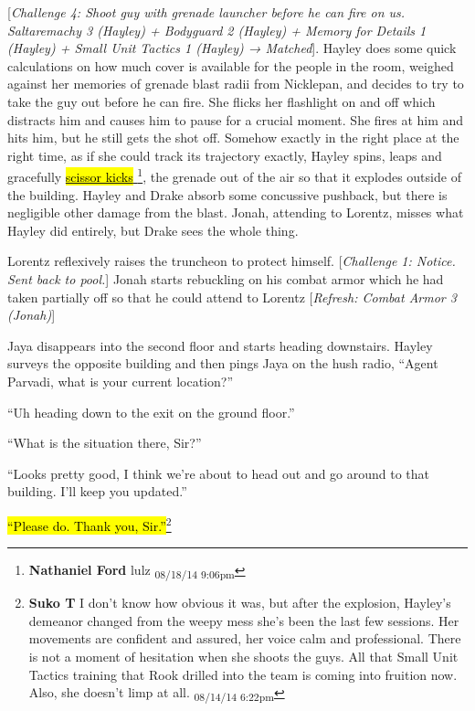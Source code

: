 {[}\textit{Challenge 4: Shoot guy with grenade launcher before he can fire on us.  Saltaremachy 3 (Hayley) + Bodyguard 2 (Hayley) + Memory for Details 1 (Hayley) + Small Unit Tactics 1 (Hayley) → Matched}{]}.  Hayley does some quick calculations on how much cover is available for the people in the room, weighed against her memories of grenade blast radii from Nicklepan, and decides to try to take the guy out before he can fire.  She flicks her flashlight on and off which distracts him and causes him to pause for a crucial moment.  She fires at him and hits him, but he still gets the shot off.  Somehow exactly in the right place at the right time, as if she could track its trajectory exactly, Hayley spins, leaps and gracefully \underline{  {\color[RGB]{17,85,204}\hl{scissor kicks}}  }\footnote{\textbf{Nathaniel Ford }lulz \textsubscript{08/18/14 9:06pm}}, the grenade out of the air so that it explodes outside of the building.  Hayley and Drake absorb some concussive pushback, but there is negligible other damage from the blast.  Jonah, attending to Lorentz, misses what Hayley did entirely, but Drake sees the whole thing.



Lorentz reflexively raises the truncheon to protect himself.  {[}\textit{Challenge 1: Notice. Sent back to pool.}{]}  Jonah starts rebuckling on his combat armor which he had taken partially off so that he could attend to Lorentz {[}\textit{Refresh: Combat Armor 3 (Jonah)}{]}



Jaya disappears into the second floor and starts heading downstairs.  Hayley surveys the opposite building and then pings Jaya on the hush radio, ``Agent Parvadi, what is your current location?''

``Uh heading down to the exit on the ground floor.''

``What is the situation there, Sir?''

``Looks pretty good, I think we're about to head out and go around to that building.  I'll keep you updated.''

\hl{``Please do. Thank you, Sir.''}\footnote{\textbf{Suko T }I don't know how obvious it was, but after the explosion, Hayley's demeanor changed from the weepy mess she's been the last few sessions.  Her movements are confident and assured, her voice calm and professional.  There is not a moment of hesitation when she shoots the guys.  All that Small Unit Tactics training that Rook drilled into the team is coming into fruition now.  Also, she doesn't limp at all. \textsubscript{08/14/14 6:22pm}}



